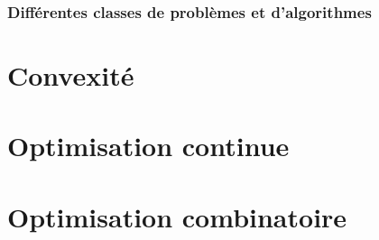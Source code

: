 \documentclass{beamer}
\begin{document}
\begin{frame}
  \frametitle{Différentes classes de problèmes et d'algorithmes}

  
\end{frame}

\section{Convexité}


\section{Optimisation continue}

\section{Optimisation combinatoire}
\end{document}
